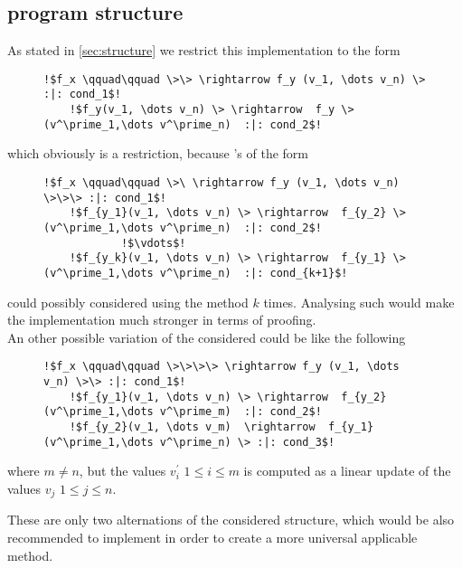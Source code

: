 \subsection{\its program structure}
\label{sec:structure-improvement}
As stated in \autoref{sec:structure} we restrict this implementation to the form 
\begin{figure}[H]
	\begin{lstlisting}[escapechar=!]
	!$f_x \qquad\qquad \>\> \rightarrow f_y (v_1, \dots v_n) \> :|: cond_1$!
	!$f_y(v_1, \dots v_n) \> \rightarrow  f_y \>(v^\prime_1,\dots v^\prime_n)  :|: cond_2$!
	\end{lstlisting}
\end{figure}
which obviously is a restriction, because \its's of the form
\begin{figure}[H]
	\begin{lstlisting}[escapechar=!]
	!$f_x \qquad\qquad \>\ \rightarrow f_y (v_1, \dots v_n) \>\>\> :|: cond_1$!
	!$f_{y_1}(v_1, \dots v_n) \> \rightarrow  f_{y_2} \>(v^\prime_1,\dots v^\prime_n)  :|: cond_2$!
			!$\vdots$!
	!$f_{y_k}(v_1, \dots v_n) \> \rightarrow  f_{y_1} \>(v^\prime_1,\dots v^\prime_n)  :|: cond_{k+1}$!
	\end{lstlisting}
\end{figure}
could possibly considered using the method $k$ times. Analysing such \its would make the implementation much stronger in terms of proofing.
\\
An other possible variation of the considered \its could be like the following
\begin{figure}[H]
	\begin{lstlisting}[escapechar=!]
	!$f_x \qquad\qquad \>\>\>\> \rightarrow f_y (v_1, \dots v_n) \>\> :|: cond_1$!
	!$f_{y_1}(v_1, \dots v_n) \> \rightarrow  f_{y_2} (v^\prime_1,\dots v^\prime_m)  :|: cond_2$!
	!$f_{y_2}(v_1, \dots v_m)  \rightarrow  f_{y_1} (v^\prime_1,\dots v^\prime_n) \> :|: cond_3$!
	\end{lstlisting}
\end{figure}
where $m \ne n$, but the values $v^\prime_i$ $1 \le i \le m$ is computed as a linear update of the values $v_j$ $1 \le j \le n$.

These are only two alternations of the considered structure, which would be also recommended to implement in order to create a more universal applicable method.